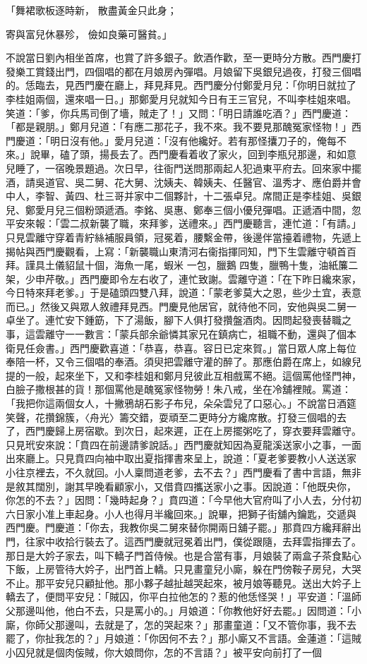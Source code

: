 「舞裙歌板逐時新，  散盡黃金只此身；

寄與富兒休暴殄，  儉如良藥可醫貧。」

不說當日劉內相坐首席，也賞了許多銀子。飲酒作歡，至一更時分方散。西門慶打發樂工賞錢出門，四個唱的都在月娘房內彈唱。月娘留下吳銀兒過夜，打發三個唱的。恁臨去，見西門慶在廳上，拜見拜見。西門慶分付鄭愛月兒：「你明日就拉了李桂姐兩個，還來唱一日。」那鄭愛月兒就知今日有王三官兒，不叫李桂姐來唱。笑道：「爹，你兵馬司倒了墻，賊走了！」又問：「明日請誰吃酒？」西門慶道：「都是親朋。」鄭月兒道：「有應二那花子，我不來。我不要見那醜冤家怪物！」西門慶道：「明日沒有他。」愛月兒道：「沒有他纔好。若有那怪攮刀子的，俺每不來。」說畢，磕了頭，揚長去了。西門慶看着收了家火，回到李瓶兒那邊，和如意兒睡了，一宿晚景題過。次日早，往衙門送問那兩起人犯過東平府去。回來家中擺酒，請吳道官、吳二舅、花大舅、沈姨夫、韓姨夫、任醫官、溫秀才、應伯爵并會中人，李智、黃四、杜三哥并家中二個夥計，十二張卓兒。席間正是李桂姐、吳銀兒、鄭愛月兒三個粉頭遞酒。李銘、吳惠、鄭奉三個小優兒彈唱。正遞酒中間，忽平安來報：「雲二叔新襲了職，來拜爹，送禮來。」西門慶聽言，連忙道：「有請。」只見雲離守穿着青紵絲補服員領，冠冕着，腰繫金帶，後邊伴當擡着禮物，先遞上揭帖與西門慶觀看，上寫：「新襲職山東清河右衞指揮同知，門下生雲離守頓首百拜。謹具土儀貂鼠十個，海魚一尾，蝦米 一包，臘鵝 四隻，臘鴨十隻，油紙簾二架，少申芹敬。」西門慶即令左右收了，連忙致謝。雲離守道：「在下昨日纔來家，今日特來拜老爹。」于是磕頭四雙八拜，說道：「蒙老爹莫大之恩，些少土宜，表意而已。」然後又與眾人敘禮拜見西。門慶見他居官，就待他不同，安他與吳二舅一卓坐了。連忙安下鍾筯，下了湯飯，腳下人俱打發攢盤酒肉。因問起發喪替職之事，這雲離守一一數言：「蒙兵部余爺憐其家兄在鎮病亡，祖職不動，還與了個本衛見任僉書。」西門慶歡喜道：「恭喜，恭喜。容日已定來賀。」當日眾人席上每位奉陪一杯，又令三個唱的奉酒。須臾把雲離守灌的醉了。那應伯爵在席上，如線兒提的一般，起來坐下，又和李桂姐和鄭月兒彼此互相戲罵不絕。這個罵他怪門神，白臉子撒根甚的貨！那個罵他是醜冤家怪物勞！朱八戒，坐在冷舖裡賊。罵道：「我把你這兩個女人，十撇鴉胡石影子布兒，朵朵雲兒了口惡心。」不說當日酒筵笑聲，花攢錦簇，〈舟光〉籌交錯，耍頑至二更時分方纔席散。打發三個唱的去了，西門慶歸上房宿歇。到次日，起來遲，正在上房擺粥吃了，穿衣要拜雲離守。只見玳安來說：「賁四在前邊請爹說話。」西門慶就知因為夏龍溪送家小之事，一面出來廳上。只見賁四向袖中取出夏指揮書來呈上，說道：「夏老爹要教小人送送家小往京裡去，不久就回。小人稟問道老爹，去不去？」西門慶看了書中言語，無非是敘其闊別，謝其早晚看顧家小，又借賁四攜送家小之事。因說道：「他既央你，你怎的不去？」因問：「幾時起身？」賁四道：「今早他大官府叫了小人去，分付初六日家小准上車起身。小人也得月半纔回來。」說畢，把獅子街舖內鑰匙，交遞與西門慶。門慶道：「你去，我教你吳二舅來替你開兩日舖子罷。」那賁四方纔拜辭出門，往家中收拾行裝去了。這西門慶就冠冕着出門，僕從跟隨，去拜雲指揮去了。那日是大妗子家去，叫下轎子門首侍候。也是合當有事，月娘裝了兩盒子茶食點心下飯，上房管待大妗子，出門首上轎。只見畫童兒小廝，躲在門傍鞍子房兒，大哭不止。那平安兒只顧扯他。那小夥子越扯越哭起來，被月娘等聽見。送出大妗子上轎去了，便問平安兒：「賊囚，你平白拉他怎的？惹的他恁怪哭！」平安道：「溫師父那邊叫他，他白不去，只是罵小的。」月娘道：「你教他好好去罷。」因問道：「小廝，你師父那邊叫，去就是了，怎的哭起來？」那畫童道：「又不管你事，我不去罷了，你扯我怎的？」月娘道：「你因何不去？」那小廝又不言語。金蓮道：「這賊小囚兒就是個肉侫賊，你大娘問你，怎的不言語？」被平安向前打了一個